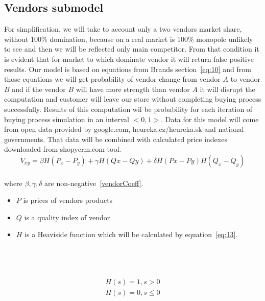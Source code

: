 \subsection{Vendors submodel} \label{subsec:model_vendors}
For simplification, we will take to account only a two vendors market share, without 100\% domination, because on a real
market is 100\% monopole unlikely to see and then we will be reflected only main competitor.
From that condition it is evident that for market to which dominate vendor it will return false positive results.
Our model is based on equations from Brands section~\ref{eq:10} and from those equations we will get probability of vendor
change from vendor $A$ to vendor $B$ and if the vendor $B$ will have more strength than vendor $A$ it will disrupt the
computation and customer will leave our store without completing buying process successfully.
Results of this computation wil be probability for each iteration of buying process simulation in an interval $<0,1>$.
Data for this model will come from open data provided by google.com, heureka.cz/heureka.sk and national governments.
That data will be combined with calculated price indexes downloaded from shopycrm.com tool.
\\
\begin{equation} \label{eq:13}
V_{xy} = \beta H(P_x-P_y) + \gamma H(Qx-Qy) + \delta H(Px-Py)H(Q_x - Q_y)
\end{equation}
\\
where $\beta, \gamma, \delta$ are non-negative~\ref{vendorCoeff}.
\\
\begin{itemize}
    \item $P$ is prices of vendors products
    \item $Q$ is a quality index of vendor
    \item $H$ is a Heaviside function which will be calculated by equation~\ref{eq:13}.
\end{itemize}\\
\\
\\
\begin{equation} \label{eq:14}
\begin{array}{l}
    H(s) = 1, s > 0 \\
    H (s) = 0, s \leq 0
\end{array}
\end{equation}
\\
